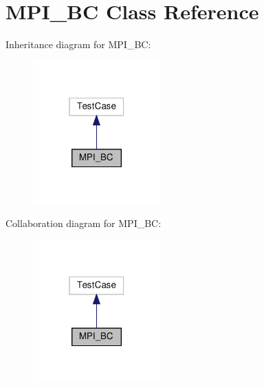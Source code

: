 \hypertarget{classMPI__BC}{}\section{M\+P\+I\+\_\+\+BC Class Reference}
\label{classMPI__BC}


Inheritance diagram for M\+P\+I\+\_\+\+BC\+:
\nopagebreak
\begin{figure}[H]
\begin{center}
\leavevmode
\includegraphics[width=139pt]{classMPI__BC__inherit__graph}
\end{center}
\end{figure}


Collaboration diagram for M\+P\+I\+\_\+\+BC\+:
\nopagebreak
\begin{figure}[H]
\begin{center}
\leavevmode
\includegraphics[width=139pt]{classMPI__BC__coll__graph}
\end{center}
\end{figure}
